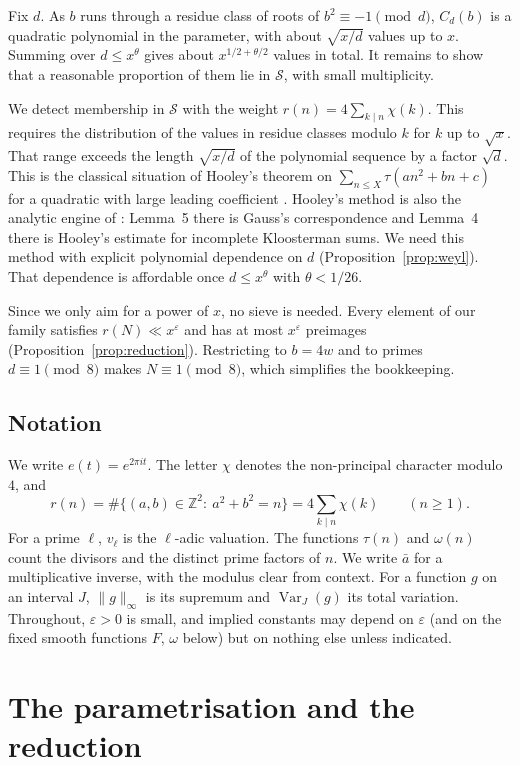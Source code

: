 \documentclass[11pt]{amsart}
\theoremstyle{remark}
\theoremstyle{definition}
\numberwithin{equation}{section}
\newcommand{\Sc}{\mathcal{S}}
\newcommand{\Z}{\mathbb{Z}}
\newcommand{\eps}{\varepsilon}
\newcommand{\Var}{\operatorname{Var}}
\begin{document}
Fix $d$. As $b$ runs through a residue class of roots of $b^2\equiv-1\pmod d$, $C_d(b)$ is a quadratic polynomial in the parameter, with about $\sqrt{x/d}$ values up to $x$. Summing over $d\le x^\theta$ gives about $x^{1/2+\theta/2}$ values in total. It remains to show that a reasonable proportion of them lie in $\Sc$, with small multiplicity.

We detect membership in $\Sc$ with the weight $r(n)=4\sum_{k\mid n}\chi(k)$. This requires the distribution of the values in residue classes modulo $k$ for $k$ up to $\sqrt x$. That range exceeds the length $\sqrt{x/d}$ of the polynomial sequence by a factor $\sqrt d$. This is the classical situation of Hooley's theorem on $\sum_{n\le X}\tau(an^2+bn+c)$ for a quadratic with large leading coefficient \cite{Ho63}. Hooley's method is also the analytic engine of \cite{FI78}: Lemma~5 there is Gauss's correspondence and Lemma~4 there is Hooley's estimate for incomplete Kloosterman sums. We need this method with explicit polynomial dependence on $d$ (Proposition~\ref{prop:weyl}). That dependence is affordable once $d\le x^{\theta}$ with $\theta<1/26$.

Since we only aim for a power of $x$, no sieve is needed. Every element of our family satisfies $r(N)\ll x^{\eps}$ and has at most $x^{\eps}$ preimages (Proposition~\ref{prop:reduction}). Restricting to $b=4w$ and to primes $d\equiv1\pmod 8$ makes $N\equiv1\pmod 8$, which simplifies the bookkeeping.

\subsection{Notation}
We write $e(t)=e^{2\pi i t}$. The letter $\chi$ denotes the non-principal character modulo $4$, and
\[
r(n)=\#\{(a,b)\in\Z^2:\ a^2+b^2=n\}=4\sum_{k\mid n}\chi(k)\qquad(n\ge1).
\]
For a prime $\ell$, $v_\ell$ is the $\ell$-adic valuation. The functions $\tau(n)$ and $\omega(n)$ count the divisors and the distinct prime factors of $n$. We write $\bar a$ for a multiplicative inverse, with the modulus clear from context. For a function $g$ on an interval $J$, $\|g\|_\infty$ is its supremum and $\Var_J(g)$ its total variation. Throughout, $\eps>0$ is small, and implied constants may depend on $\eps$ (and on the fixed smooth functions $F$, $\omega$ below) but on nothing else unless indicated.

\section{The parametrisation and the reduction}
\end{document}
